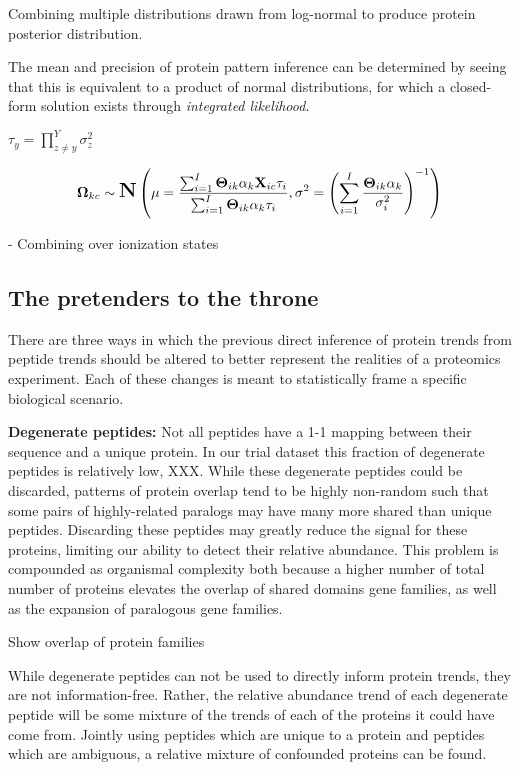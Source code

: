 \documentclass[12pt]{article}
\begin{document}
Combining multiple distributions drawn from log-normal to produce protein posterior distribution.

The mean and precision of protein pattern inference can be determined by seeing that this is equivalent to a product of normal distributions, for which a closed-form solution exists through \textit{integrated likelihood}.

$\tau_{y} = \prod_{z \neq y}^{Y}\sigma^{2}_{z}$

\begin{align}
\mathbf{\Omega}_{kc} \sim \mbox{\Large \textbf{N}}\left(\mu = \frac{\sum_{i = 1}^{I}\mathbf{\Theta}_{ik}\alpha_{k}\textbf{X}_{ic}\tau_{i}}{\sum_{i = 1}^{I}\mathbf{\Theta}_{ik}\alpha_{k}\tau_{i}}, \sigma^{2} =  \left(\sum_{i = 1}^{I}\frac{\mathbf{\Theta}_{ik}\alpha_{k}}{\sigma^{2}_{i}}\right)^{-1} \right)
\end{align}

- Combining over ionization states

\subsection*{The pretenders to the throne}

There are three ways in which the previous direct inference of protein trends from peptide trends should be altered to better represent the realities of a proteomics experiment. Each of these changes is meant to statistically frame a specific biological scenario.

\textbf{Degenerate peptides:} Not all peptides have a 1-1 mapping between their sequence and a unique protein. In our trial dataset this fraction of degenerate peptides is relatively low, XXX. While these degenerate peptides could be discarded, patterns of protein overlap tend to be highly non-random such that some pairs of highly-related paralogs may have many more shared than unique peptides. Discarding these peptides may greatly reduce the signal for these proteins, limiting our ability to detect their relative abundance. This problem is compounded as organismal complexity both because a higher number of total number of proteins elevates the overlap of shared domains gene families, as well as the expansion of paralogous gene families.

Show overlap of protein families

While degenerate peptides can not be used to directly inform protein trends, they are not information-free. Rather, the relative abundance trend of each degenerate peptide will be some mixture of the trends of each of the proteins it could have come from. Jointly using peptides which are unique to a protein and peptides which are ambiguous, a relative mixture of confounded proteins can be found.
\end{document}
